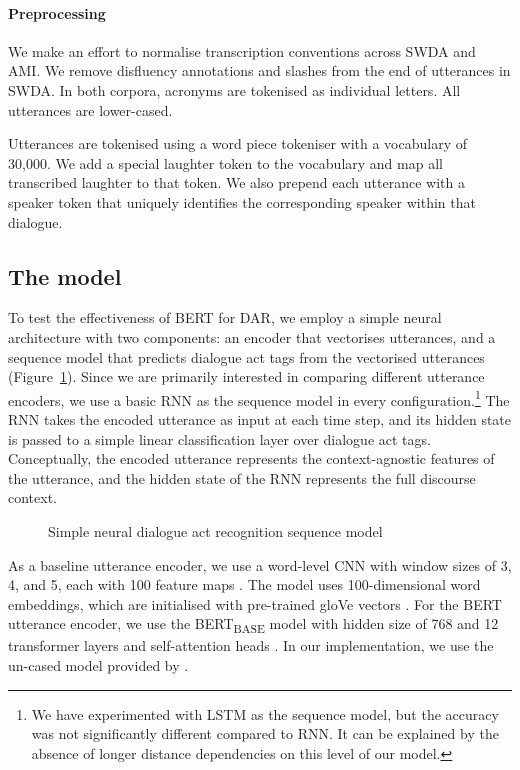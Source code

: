 \documentclass[11pt,a4paper]{article}
\begin{document}
\paragraph{Preprocessing}

We make an effort to normalise transcription conventions across SWDA and AMI.
We remove disfluency annotations and slashes from the end of utterances in SWDA.
In both corpora, acronyms are tokenised as individual letters. 
All utterances are lower-cased.

Utterances are tokenised using a word piece tokeniser \citep{Wu2016} with a vocabulary of 30,000.
We add a special laughter token to the vocabulary and map all transcribed laughter to that token.
We also  prepend each utterance with a speaker token that uniquely identifies the corresponding speaker within that dialogue.


\subsection{The model}
\label{sec:model}
To test the effectiveness of BERT for DAR, we employ a simple neural architecture with two components: an encoder that vectorises utterances, and a sequence model that predicts dialogue act tags from the vectorised utterances (Figure~\ref{fig:model-architecture}).
Since we are primarily interested in comparing different utterance encoders, we use a basic RNN as the sequence model in every configuration.\footnote{We have experimented with LSTM as the sequence model, but the accuracy was not significantly different compared to RNN. It can be explained by the absence of longer distance dependencies on this level of our model.} 
The RNN takes the encoded utterance as input at each time step,
and its hidden state is passed to a simple linear classification layer over dialogue act tags.
Conceptually, the encoded utterance represents the context-agnostic features of the utterance, and the hidden state of the RNN represents the full discourse context.

\begin{figure}
  
  \caption{Simple neural dialogue act recognition sequence model}
  \label{fig:model-architecture}
\end{figure}

As a baseline utterance encoder, we use a word-level CNN with window sizes of 3, 4, and 5, each with 100 feature maps \citep{kimConvolutionalNeuralNetworks2014}. 
The model uses 100-dimensional word embeddings, which are initialised with pre-trained gloVe vectors \citep{penningtonGloveGlobalVectors2014}.
%
For the BERT utterance encoder, we use the BERT\textsubscript{BASE} model with hidden size of 768 and 12 transformer layers and self-attention heads \citep[][\S3.1]{devlinBERTPretrainingDeep2018}.
In our implementation, we use the un-cased model provided by \citet{wolfHuggingFaceTransformersStateoftheart2019}.
\end{document}
